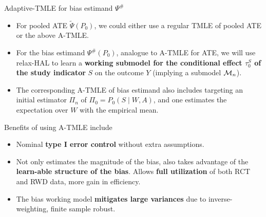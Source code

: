 \documentclass[t]{beamer}
\begin{document}
\begin{frame}{Adaptive-TMLE for bias estimand $\Psi^{\#}$}
\begin{itemize}
\item For pooled ATE $\tilde{\Psi}(P_0)$, we  could either use a regular TMLE of pooled ATE or the above A-TMLE.
\item For the bias estimand $\Psi^{\#}(P_0)$, analogue to A-TMLE for ATE,  we will use relax-HAL to learn a \textbf{working submodel for the conditional effect $\tau^S_0$ of the study indicator} $S$ on the outcome $Y$ (implying a submodel ${\cal M}_n$). 
\item The corresponding A-TMLE of bias estimand also includes targeting an initial estimator $\Pi_n$ of $\Pi_0=P_0(S\mid W,A)$, and one estimates the expectation over $W$ with the empirical mean. 
\end{itemize}
\end{frame}

\begin{frame}{Benefits of using A-TMLE include}
\begin{itemize}
\item Nominal \textbf{type I error control} without extra assumptions.
\item Not only estimates the magnitude of the bias, also takes advantage of the \textbf{learn-able structure of the bias}. Allows \textbf{full utilization} of both RCT and RWD data, more gain in efficiency.
\item The bias working model \textbf{mitigates large variances} due to inverse-weighting, finite sample robust.
\end{itemize}
\end{frame}
\end{document}
